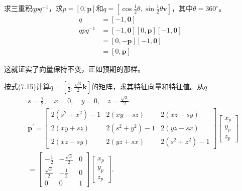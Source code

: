 \begin{example}
    求三重积$q p q^{-1}$，求$p=[0, \mathbf{p}]$和$q=\left[\cos \frac{1}{2} \theta, \sin \frac{1}{2} \theta \mathbf{v}\right]$，其中$\theta=360^{\circ}$。
$$
\begin{aligned}
q & =[-1, \mathbf{0}] \\
q p q^{-1} & =[-1, \mathbf{0}][0, \mathbf{p}][-1, \mathbf{0}] \\
& =[0,-\mathbf{p}][-1, \mathbf{0}] \\
& =[0, \mathbf{p}]
\end{aligned}
$$

这就证实了向量保持不变，正如预期的那样。
\end{example}

\begin{example}
    
    按式(7.15)计算$q=\left[\frac{1}{2}, \frac{\sqrt{3}}{2} \mathbf{k}\right]$的矩阵，求其特征向量和特征值。从$q$
    $$
    \begin{aligned}
    & s=\frac{1}{2}, \quad x=0, \quad y=0, \quad z=\frac{\sqrt{3}}{2} \\
    & \mathbf{p}^{\prime}=\left[\begin{array}{ccc}2\left(s^{2}+x^{2}\right)-1 & 2(x y-s z) & 2(x z+s y) \\2(x y+s z) & 2\left(s^{2}+y^{2}\right)-1 & 2(y z-s x) \\2(x z-s y) & 2(y z+s x) & 2\left(s^{2}+z^{2}\right)-1\end{array}\right]\left[\begin{array}{l}x_{p} \\y_{p} \\z_{p}\end{array}\right] \\
    & =\left[\begin{array}{ccc}-\frac{1}{2} & -\frac{\sqrt{3}}{2} & 0 \\\frac{\sqrt{3}}{2} & -\frac{1}{2} & 0 \\0 & 0 & 1\end{array}\right]\left[\begin{array}{l}x_{p} \\y_{p} \\z_{p}\end{array}\right] \text {. }
    \end{aligned}
    $$
    

\end{example}
